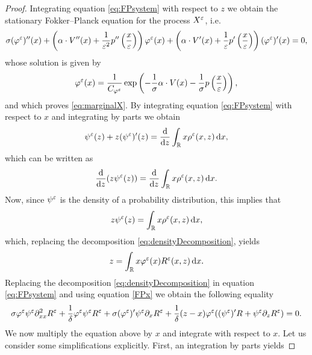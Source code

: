 \documentclass[10pt]{article}
\begin{document}
\begin{proof} Integrating equation \eqref{eq:FPsystem} with respect to $z$ we obtain the stationary Fokker--Planck equation for the process $X^\varepsilon$, i.e.
\begin{equation}
\label{FPx}
\sigma (\varphi^\varepsilon)''(x) + \left ( \alpha \cdot V''(x) + \frac{1}{\varepsilon^2} p'' \left ( \frac{x}{\varepsilon} \right ) \right ) \varphi^\varepsilon(x) + \left ( \alpha \cdot V'(x) + \frac{1}{\varepsilon} p' \left ( \frac{x}{\varepsilon} \right ) \right ) (\varphi^\varepsilon)'(x) = 0,
\end{equation}
whose solution is given by
\begin{equation}
\varphi^\varepsilon(x) = \frac{1}{C_{\varphi^\varepsilon}} \exp\left(- \frac{1}{\sigma} \alpha \cdot V(x) - \frac{1}{\sigma} p \left ( \frac{x}{\varepsilon} \right )\right),
\end{equation}
and which proves \eqref{eq:marginalX}. By integrating equation \eqref{eq:FPsystem} with respect to $x$ and integrating by parts we obtain
\begin{equation}
\psi^\varepsilon(z) + z (\psi^\varepsilon)'(z) = \frac{\mathrm{d}}{\mathrm{d} z} \int_{\mathbb{R}} x \rho^\varepsilon(x,z) \,\mathrm{d} x,
\end{equation}
which can be written as
\begin{equation}
	\frac{\mathrm{d}}{\mathrm{d} z} (z \psi^\varepsilon(z)) = \frac{\mathrm{d}}{\mathrm{d} z} \int_{\mathbb{R}} x \rho^\varepsilon(x,z) \,\mathrm{d} x.
\end{equation}
Now, since $\psi^\varepsilon$ is the density of a probability distribution, this implies that 
\begin{equation}\label{FPz}
z \psi^\varepsilon(z) = \int_{\mathbb{R}} x \rho^\varepsilon(x,z) \,\mathrm{d} x,
\end{equation}
which, replacing the decomposition \eqref{eq:densityDecomposition}, yields
\begin{equation} \label{eq:z_condition}
z = \int_{\mathbb{R}} x \varphi^\varepsilon(x) R^\varepsilon(x,z) \,\mathrm{d} x.
\end{equation}
Replacing the decomposition \eqref{eq:densityDecomposition} in equation \eqref{eq:FPsystem} and using equation \eqref{FPx} we obtain the following equality
\begin{equation}\label{eq:psiEqualityPDE}
\sigma \varphi^\varepsilon \psi^\varepsilon \partial^2_{xx} R^\varepsilon + \frac{1}{\delta} \varphi^\varepsilon \psi^\varepsilon R^\varepsilon + \sigma (\varphi^\varepsilon)' \psi^\varepsilon \partial_x R^\varepsilon + \frac{1}{\delta} (z-x) \varphi^\varepsilon ((\psi^\varepsilon)' R + \psi^\varepsilon \partial_z R^\varepsilon) = 0.
\end{equation}
We now multiply the equation above by $x$ and integrate with respect to $x$. Let us consider some simplifications explicitly. First, an integration by parts yields

\end{proof}
\end{document}
